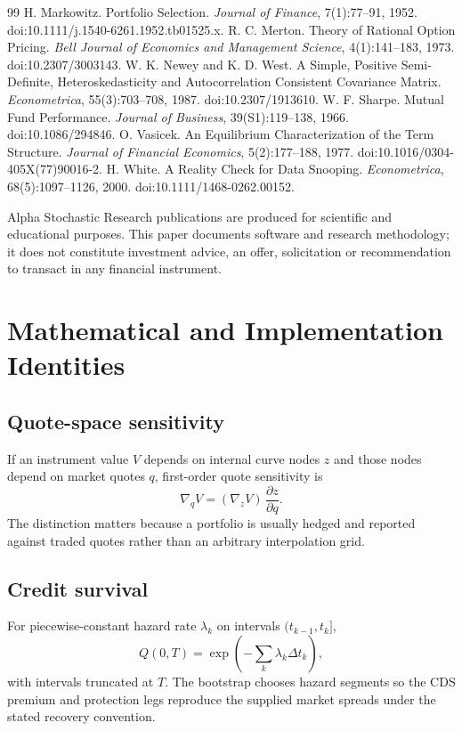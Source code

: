 \documentclass{asrpaper}
\begin{document}
\begin{thebibliography}{99}
 H. Markowitz. Portfolio Selection. \emph{Journal of Finance}, 7(1):77--91, 1952. doi:10.1111/j.1540-6261.1952.tb01525.x.
 R. C. Merton. Theory of Rational Option Pricing. \emph{Bell Journal of Economics and Management Science}, 4(1):141--183, 1973. doi:10.2307/3003143.
 W. K. Newey and K. D. West. A Simple, Positive Semi-Definite, Heteroskedasticity and Autocorrelation Consistent Covariance Matrix. \emph{Econometrica}, 55(3):703--708, 1987. doi:10.2307/1913610.
 W. F. Sharpe. Mutual Fund Performance. \emph{Journal of Business}, 39(S1):119--138, 1966. doi:10.1086/294846.
 O. Vasicek. An Equilibrium Characterization of the Term Structure. \emph{Journal of Financial Economics}, 5(2):177--188, 1977. doi:10.1016/0304-405X(77)90016-2.
 H. White. A Reality Check for Data Snooping. \emph{Econometrica}, 68(5):1097--1126, 2000. doi:10.1111/1468-0262.00152.
\end{thebibliography}

{\small Alpha Stochastic Research publications are produced for scientific and educational purposes. This paper documents software and research methodology; it does not constitute investment advice, an offer, solicitation or recommendation to transact in any financial instrument.}
\clearpage\onecolumn\appendix
\section{Mathematical and Implementation Identities}
\subsection{Quote-space sensitivity}
If an instrument value $V$ depends on internal curve nodes $z$ and those nodes depend on market quotes $q$, first-order quote sensitivity is
\begin{equation}
\nabla_qV=(\nabla_zV)\,\frac{\partial z}{\partial q}.
\end{equation}
The distinction matters because a portfolio is usually hedged and reported against traded quotes rather than an arbitrary interpolation grid.

\subsection{Credit survival}
For piecewise-constant hazard rate $\lambda_k$ on intervals $(t_{k-1},t_k]$,
\begin{equation}
Q(0,T)=\exp\left(-\sum_k \lambda_k\Delta t_k\right),
\end{equation}
with intervals truncated at $T$. The bootstrap chooses hazard segments so the CDS premium and protection legs reproduce the supplied market spreads under the stated recovery convention.
\end{document}
